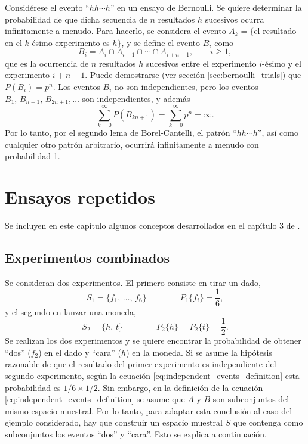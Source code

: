 \documentclass[a4paper]{report}
\begin{document}
Considérese el evento ``\(hh\cdots h\)'' en un ensayo de Bernoulli.
Se quiere determinar la probabilidad de que dicha secuencia de \(n\) resultados \(h\) sucesivos ocurra infinitamente a menudo. Para hacerlo, se considera el evento \(A_k=\{\)el resultado en el \(k\)-ésimo experimento es \(h\}\), y se define el evento \(B_i\) como
\[
 B_i=A_i\cap A_{i+1}\cap \cdots \cap A_{i+n-1},\qquad i\geq 1,
\]
que es la ocurrencia de \(n\) resultados \(h\) sucesivos entre el experimento \(i\)-ésimo y el experimento \(i+n-1\). Puede demostrarse (ver sección \ref{sec:bernoulli_trials}) que \(P(B_i)=p^n\). Los eventos \(B_i\) no son independientes, pero los eventos \(B_1,\,B_{n+1},\,B_{2n+1},\dots\) son independientes, y además
\[
 \sum_{k=0}^{\infty}P(B_{kn+1})=\sum_{k=0}^{\infty}p^n=\infty.
\]
Por lo tanto, por el segundo lema de Borel-Cantelli, el patrón ``\(hh\cdots h\)'', así como cualquier otro patrón arbitrario, ocurrirá infinitamente a menudo con probabilidad 1.


\chapter{Ensayos repetidos}\label{ch:repeated_trials}

Se incluyen en este capítulo algunos conceptos desarrollados en el capítulo 3 de \cite{papoulis2002probability}.


\section{Experimentos combinados}

Se consideran dos experimentos. El primero consiste en tirar un dado,
\[
 S_1=\{f_1,\,\dots,\,f_6\}\qquad\qquad P_1\{f_i\}=\frac{1}{6},
\]
y el segundo en lanzar una moneda,
\[
 S_2=\{h,\,t\}\qquad\qquad P_2\{h\}=P_2\{t\}=\frac{1}{2}.
\]
Se realizan los dos experimentos y se quiere encontrar la probabilidad de obtener ``dos'' (\(f_2\)) en el dado y ``cara'' (\(h\)) en la moneda. Si se asume la hipótesis razonable de que el resultado del primer experimento es independiente del segundo experimento, según la ecuación \ref{eq:independent_events_definition} esta probabilidad es \(1/6\times1/2\). Sin embargo, en la definición de la ecuación \ref{eq:independent_events_definition} se asume que \(A\) y \(B\) son subconjuntos del mismo espacio muestral. Por lo tanto, para adaptar esta conclusión al caso del ejemplo considerado, hay que construir un espacio muestral \(S\) que contenga como subconjuntos los eventos ``dos'' y ``cara''. Esto se explica a continuación.
\end{document}
